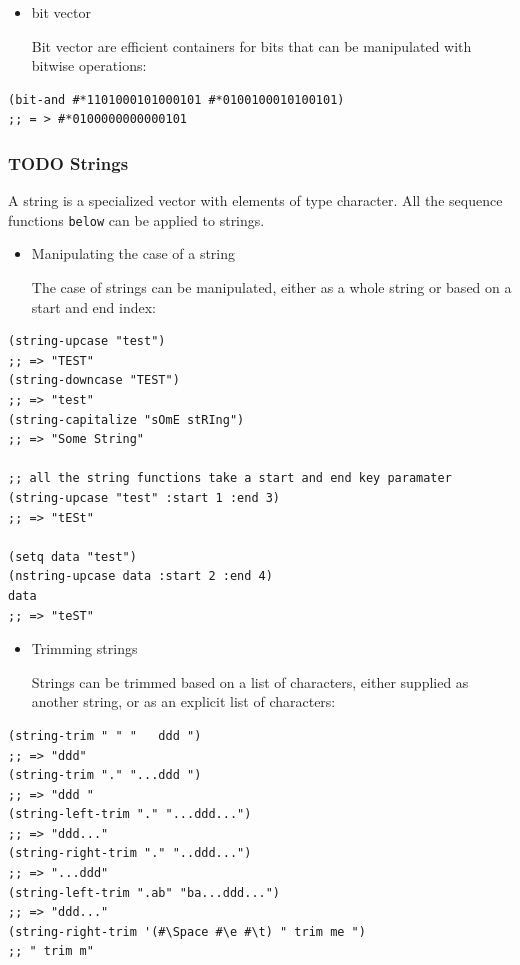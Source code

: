 \documentclass[11pt]{article}
\begin{document}
\begin{itemize}
\item bit vector

Bit vector are efficient containers for bits that can be
manipulated with bitwise operations:
\end{itemize}

\begin{verbatim}
(bit-and #*1101000101000101 #*0100100010100101)
;; = > #*0100000000000101
\end{verbatim}

\subsubsection{{\bfseries\sffamily TODO} Strings}
\label{sec-5-2-2}
A string is a specialized vector with elements of type
character. All the sequence functions \texttt{below} can be applied to
strings.

\begin{itemize}
\item Manipulating the case of a string

The case of strings can be manipulated, either as a whole string
or based on a start and end index:
\end{itemize}

\begin{verbatim}
(string-upcase "test")
;; => "TEST"
(string-downcase "TEST")
;; => "test"
(string-capitalize "sOmE stRIng")
;; => "Some String"

;; all the string functions take a start and end key paramater
(string-upcase "test" :start 1 :end 3)
;; => "tESt"

(setq data "test")
(nstring-upcase data :start 2 :end 4)
data
;; => "teST"
\end{verbatim}

\begin{itemize}
\item Trimming strings

Strings can be trimmed based on a list of characters, either
supplied as another string, or as an explicit list of
characters:
\end{itemize}

\begin{verbatim}
(string-trim " " "   ddd ")
;; => "ddd"
(string-trim "." "...ddd ")
;; => "ddd "
(string-left-trim "." "...ddd...")
;; => "ddd..."
(string-right-trim "." "..ddd...")
;; => "...ddd"
(string-left-trim ".ab" "ba...ddd...")
;; => "ddd..."
(string-right-trim '(#\Space #\e #\t) " trim me ")
;; " trim m"
\end{verbatim}
\end{document}
